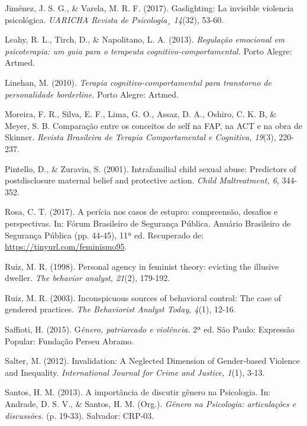 \hangindent=25pt
\noindent Jiménez, J. S. G., \& Varela, M. R. F. (2017). Gaslighting: La invisible violencia psicológica. \textit{UARICHA Revista de Psicología¸ 14}(32), 53-60.

\hangindent=25pt
\noindent Leahy, R. L., Tirch, D., \& Napolitano, L. A. (2013). \textit{Regulação emocional em psicoterapia: um guia para o terapeuta cognitivo-compor\-tamental.} Porto Alegre: Artmed.

\hangindent=25pt
\noindent Linehan, M. (2010). \textit{Terapia cognitivo-comportamental para transtorno de personalidade borderline.} Porto Alegre: Artmed. 

\hangindent=25pt
\noindent Moreira, F. R., Silva, E. F., Lima, G. O., Assaz, D. A., Oshiro, C. K. B, \& Meyer, S. B. Comparação entre os conceitos de self na FAP, na ACT e na obra de Skinner. \textit{Revista Brasileira de Terapia Comportamental e Cognitiva, 19}(3), 220-237.

\hangindent=25pt
\noindent Pintello, D., \& Zuravin, S. (2001). Intrafamilial child sexual abuse: Predictors of postdisclosure maternal belief and protective action. \textit{Child Maltreatment, 6}, 344-352.

\hangindent=25pt
\noindent Rosa, C. T. (2017). A perícia nos casos de estupro: compreensão, desafios e perspectivas. In: Fórum Brasileiro de Segurança Pública. Anuário Brasileiro de Segurança Pública (pp. 44-45), 11ª ed. Recuperado de: \url{https://tinyurl.com/feminismo95}.

\hangindent=25pt
\noindent Ruiz, M. R. (1998). Personal agency in feminist theory: evicting the illusive dweller. \textit{The behavior analyst, 21}(2), 179-192.

\hangindent=25pt
\noindent Ruiz, M. R. (2003). Inconspicuous sources of behavioral control: The case of gendered practices. \textit{The Behaviorist Analyst Today, 4}(1), 12-16. 

\hangindent=25pt
\noindent Saffioti, H. (2015). G\textit{ênero, patriarcado e violência.} 2ª ed. São Paulo: Expressão Popular: Fundação Perseu Abramo.

\hangindent=25pt
\noindent Salter, M. (2012). Invalidation: A Neglected Dimension of Gender‐based Violence and Inequality. \textit{International Journal for Crime and Justice, 1}(1), 3-13.

\hangindent=25pt
\noindent Santos, H. M. (2013). A importância de discutir gênero na Psicologia. In: Andrade, D. S. V., \& Santos, H. M. (Org.). \textit{Gênero na Psicologia: articulações e discussões.} (p. 19-33). Salvador: CRP-03.

